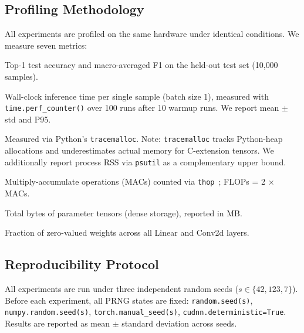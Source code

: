 \subsection{Profiling Methodology}
\label{sec:profiling}

All experiments are profiled on the same hardware under identical conditions.
We measure seven metrics:

\begin{description}[leftmargin=1.5em,itemsep=2pt]
  \item[\textbf{Accuracy / F1}] Top-1 test accuracy and macro-averaged F1
    on the held-out test set (10{,}000 samples).
  \item[\textbf{Latency}] Wall-clock inference time per single sample
    (batch size 1), measured with \texttt{time.perf\_counter()} over
    100 runs after 10 warmup runs. We report mean $\pm$ std and P95.
  \item[\textbf{Peak RAM}] Measured via Python's \texttt{tracemalloc}.
    Note: \texttt{tracemalloc} tracks Python-heap allocations and
    underestimates actual memory for C-extension tensors.
    We additionally report process RSS via \texttt{psutil} as a
    complementary upper bound.
  \item[\textbf{Theoretical FLOPs}] Multiply-accumulate operations (MACs)
    counted via \texttt{thop}~\citep{thop2019}; FLOPs = 2 $\times$ MACs.
  \item[\textbf{Model size}] Total bytes of parameter tensors
    (dense storage), reported in MB.
  \item[\textbf{Global sparsity}] Fraction of zero-valued weights across
    all Linear and Conv2d layers.
\end{description}

\subsection{Reproducibility Protocol}
\label{sec:reproducibility}

All experiments are run under three independent random seeds
($s \in \{42, 123, 7\}$).
Before each experiment, all PRNG states are fixed:
\texttt{random.seed(s)}, \texttt{numpy.random.seed(s)},
\texttt{torch.manual\_seed(s)}, \texttt{cudnn.deterministic=True}.
Results are reported as mean $\pm$ standard deviation across seeds.
